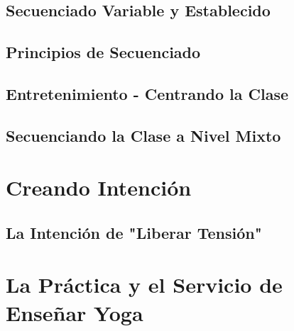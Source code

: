 \subsection{Secuenciado Variable y Establecido}
\subsection{Principios de Secuenciado}
\subsection{Entretenimiento - Centrando la Clase}
\subsection{Secuenciando la Clase a Nivel Mixto}
\section{Creando Intención}
\subsection{La Intención de "Liberar Tensión"}
\section{La Práctica y el Servicio de Enseñar Yoga}


